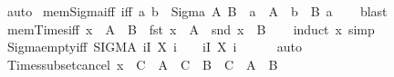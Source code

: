 \begin{isabellebody}
\isamarkupfalse%
\ auto%
\endisatagproof
{\isafoldproof}%
%
\isadelimproof
\isanewline
%
\endisadelimproof
\isanewline
{}\isamarkupfalse%
\ mem{\isacharunderscore}{\kern0pt}Sigma{\isacharunderscore}{\kern0pt}iff\ {\isacharbrackleft}{\kern0pt}iff{\isacharbrackright}{\kern0pt}{\isacharcolon}{\kern0pt}\ {\isachardoublequoteopen}{\isacharparenleft}{\kern0pt}a{\isacharcomma}{\kern0pt}\ b{\isacharparenright}{\kern0pt}\ {\isasymin}\ Sigma\ A\ B\ {\isasymlongleftrightarrow}\ a\ {\isasymin}\ A\ {\isasymand}\ b\ {\isasymin}\ B\ a{\isachardoublequoteclose}\isanewline
%
\isadelimproof
\ \ %
\endisadelimproof
%
\isatagproof
{}\isamarkupfalse%
\ blast%
\endisatagproof
{\isafoldproof}%
%
\isadelimproof
\isanewline
%
\endisadelimproof
\isanewline
{}\isamarkupfalse%
\ mem{\isacharunderscore}{\kern0pt}Times{\isacharunderscore}{\kern0pt}iff{\isacharcolon}{\kern0pt}\ {\isachardoublequoteopen}x\ {\isasymin}\ A\ {\isasymtimes}\ B\ {\isasymlongleftrightarrow}\ fst\ x\ {\isasymin}\ A\ {\isasymand}\ snd\ x\ {\isasymin}\ B{\isachardoublequoteclose}\isanewline
%
\isadelimproof
\ \ %
\endisadelimproof
%
\isatagproof
{}\isamarkupfalse%
\ {\isacharparenleft}{\kern0pt}induct\ x{\isacharparenright}{\kern0pt}\ simp%
\endisatagproof
{\isafoldproof}%
%
\isadelimproof
\isanewline
%
\endisadelimproof
\isanewline
{}\isamarkupfalse%
\ Sigma{\isacharunderscore}{\kern0pt}empty{\isacharunderscore}{\kern0pt}iff{\isacharcolon}{\kern0pt}\ {\isachardoublequoteopen}{\isacharparenleft}{\kern0pt}SIGMA\ i{\isacharcolon}{\kern0pt}I{\isachardot}{\kern0pt}\ X\ i{\isacharparenright}{\kern0pt}\ {\isacharequal}{\kern0pt}\ {\isacharbraceleft}{\kern0pt}{\isacharbraceright}{\kern0pt}\ {\isasymlongleftrightarrow}\ {\isacharparenleft}{\kern0pt}{\isasymforall}i{\isasymin}I{\isachardot}{\kern0pt}\ X\ i\ {\isacharequal}{\kern0pt}\ {\isacharbraceleft}{\kern0pt}{\isacharbraceright}{\kern0pt}{\isacharparenright}{\kern0pt}{\isachardoublequoteclose}\isanewline
%
\isadelimproof
\ \ %
\endisadelimproof
%
\isatagproof
{}\isamarkupfalse%
\ auto%
\endisatagproof
{\isafoldproof}%
%
\isadelimproof
\isanewline
%
\endisadelimproof
\isanewline
{}\isamarkupfalse%
\ Times{\isacharunderscore}{\kern0pt}subset{\isacharunderscore}{\kern0pt}cancel{}{\isacharcolon}{\kern0pt}\ {\isachardoublequoteopen}x\ {\isasymin}\ C\ {\isasymLongrightarrow}\ A\ {\isasymtimes}\ C\ {\isasymsubseteq}\ B\ {\isasymtimes}\ C\ {\isasymlongleftrightarrow}\ A\ {\isasymsubseteq}\ B{\isachardoublequoteclose}\isanewline
%
\isadelimproof
\ \ %

\end{isabellebody}
